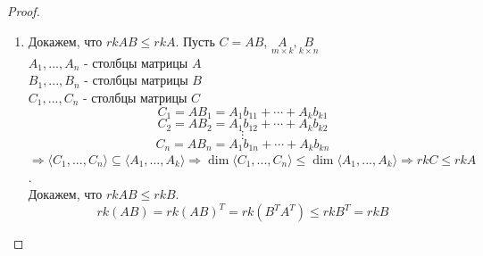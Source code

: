 \documentclass[a4paper, 12pt]{article}
\theoremstyle{definition}
\begin{document}
\begin{proof}
\begin{enumerate}
      \item Докажем, что $rkAB \leq rkA$. Пусть $C =AB$, $\underset{m \times k}{A}, \underset{k \times n}{B}$ \\
      $A_1,...,A_n$ - столбцы матрицы $A$ \\
      $B_1,...,B_n$ - столбцы матрицы $B$ \\
      $C_1,...,C_n$ - столбцы матрицы $C$
      $$C_1 = AB_1 = A_1b_{11} + \cdots + A_kb_{k1}$$ 
      $$C_2 = AB_2 = A_1b_{12} + \cdots + A_kb_{k2}$$
      $$\vdots$$
      $$C_n = AB_n = A_1b_{1n} + \cdots + A_kb_{kn}$$
      $\Longrightarrow \langle C_1,...,C_n \rangle \subseteq \langle A_1,...,A_k \rangle \Longrightarrow \dim\langle C_1,...,C_n \rangle \leq \dim\langle A_1,...,A_k \rangle \Longrightarrow rkC\leq rkA$. \\
      Докажем, что $rkAB \leq rkB$.
      $$rk(AB) = rk(AB)^T = rk(B^TA^T) \leq rkB^T = rkB$$ 
    \end{enumerate}
  \end{proof}

  \newpage
  
\end{document}
